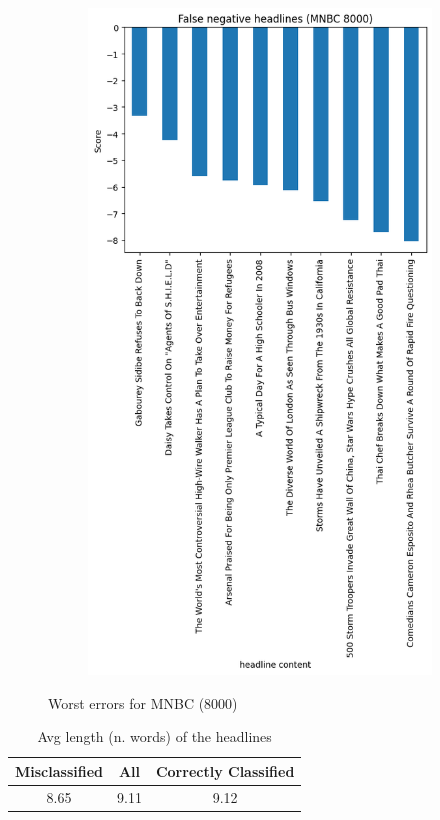 \documentclass{article}
\begin{document}
\begin{multicols}{2}
\begin{figure}[H]
        \begin{subfigure}{\linewidth}
        \centering
        \includegraphics[width=0.90\columnwidth]{Figures/false_neg_bestACC.png}
        \end{subfigure}
        
        \caption{\footnotesize Worst errors for MNBC (8000)}
        \label{fig:WE_ACC}
        
    \end{figure}

\begin{table}[H]
    \small
    \centering
    \begin{tabular}{|c|c|c|}
    \hline
    \rowcolor{pyblue!60}
    \textbf{Misclassified} & \textbf{All} & \textbf{Correctly Classified}\\ \hline
    8.65 & 9.11 & 9.12 \\ \hline
    \end{tabular}
    \caption{\footnotesize Avg length (n. words) of the headlines}
    \label{tab:LENGTH_acc}
\end{table}


\end{multicols}
\end{document}
